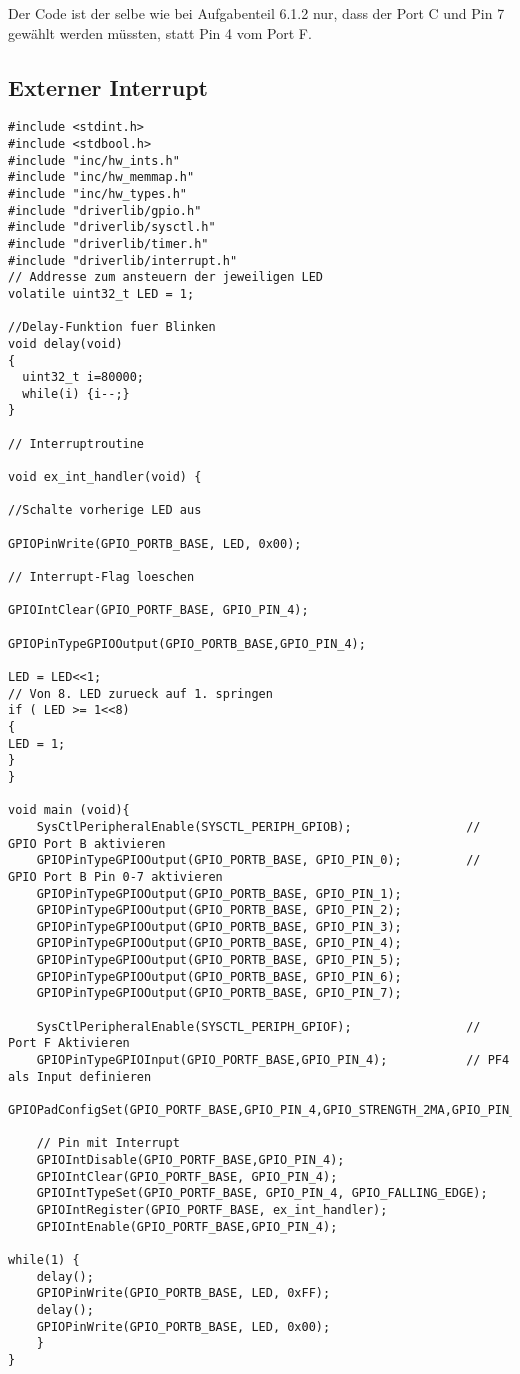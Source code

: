 \subsubsection{}
Der Code ist der selbe wie bei Aufgabenteil 6.1.2 nur, dass der Port C und Pin 7 gewählt werden müssten, statt Pin 4 vom Port F. 
\newpage
\subsection{Externer Interrupt}
\begin{lstlisting}
#include <stdint.h>
#include <stdbool.h>
#include "inc/hw_ints.h"
#include "inc/hw_memmap.h"
#include "inc/hw_types.h"
#include "driverlib/gpio.h"
#include "driverlib/sysctl.h"
#include "driverlib/timer.h"
#include "driverlib/interrupt.h"
// Addresse zum ansteuern der jeweiligen LED
volatile uint32_t LED = 1;

//Delay-Funktion fuer Blinken
void delay(void)
{
  uint32_t i=80000;
  while(i) {i--;}
}

// Interruptroutine

void ex_int_handler(void) {

//Schalte vorherige LED aus

GPIOPinWrite(GPIO_PORTB_BASE, LED, 0x00);

// Interrupt-Flag loeschen

GPIOIntClear(GPIO_PORTF_BASE, GPIO_PIN_4);

GPIOPinTypeGPIOOutput(GPIO_PORTB_BASE,GPIO_PIN_4);

LED = LED<<1;
// Von 8. LED zurueck auf 1. springen
if ( LED >= 1<<8)
{
LED = 1;
}
}

void main (void){
    SysCtlPeripheralEnable(SYSCTL_PERIPH_GPIOB);                // GPIO Port B aktivieren
    GPIOPinTypeGPIOOutput(GPIO_PORTB_BASE, GPIO_PIN_0);         // GPIO Port B Pin 0-7 aktivieren
    GPIOPinTypeGPIOOutput(GPIO_PORTB_BASE, GPIO_PIN_1);
    GPIOPinTypeGPIOOutput(GPIO_PORTB_BASE, GPIO_PIN_2);
    GPIOPinTypeGPIOOutput(GPIO_PORTB_BASE, GPIO_PIN_3);
    GPIOPinTypeGPIOOutput(GPIO_PORTB_BASE, GPIO_PIN_4);
    GPIOPinTypeGPIOOutput(GPIO_PORTB_BASE, GPIO_PIN_5);
    GPIOPinTypeGPIOOutput(GPIO_PORTB_BASE, GPIO_PIN_6);
    GPIOPinTypeGPIOOutput(GPIO_PORTB_BASE, GPIO_PIN_7);

    SysCtlPeripheralEnable(SYSCTL_PERIPH_GPIOF);                // Port F Aktivieren
    GPIOPinTypeGPIOInput(GPIO_PORTF_BASE,GPIO_PIN_4);           // PF4 als Input definieren
    GPIOPadConfigSet(GPIO_PORTF_BASE,GPIO_PIN_4,GPIO_STRENGTH_2MA,GPIO_PIN_TYPE_STD_WPU);

    // Pin mit Interrupt
    GPIOIntDisable(GPIO_PORTF_BASE,GPIO_PIN_4);
    GPIOIntClear(GPIO_PORTF_BASE, GPIO_PIN_4);
    GPIOIntTypeSet(GPIO_PORTF_BASE, GPIO_PIN_4, GPIO_FALLING_EDGE);
    GPIOIntRegister(GPIO_PORTF_BASE, ex_int_handler);
    GPIOIntEnable(GPIO_PORTF_BASE,GPIO_PIN_4);

while(1) {
    delay();
    GPIOPinWrite(GPIO_PORTB_BASE, LED, 0xFF);
    delay();
    GPIOPinWrite(GPIO_PORTB_BASE, LED, 0x00);
	}
}
\end{lstlisting}